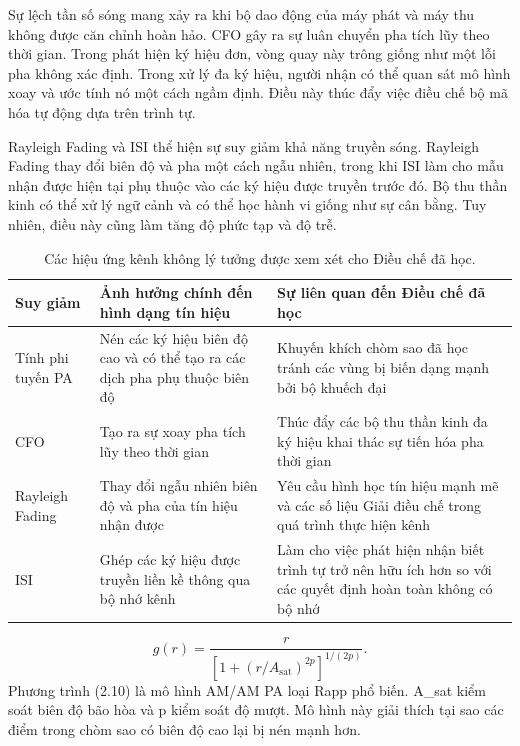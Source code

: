 Sự lệch tần số sóng mang xảy ra khi bộ dao động của máy phát và máy thu không được căn chỉnh hoàn hảo. CFO gây ra sự luân chuyển pha tích lũy theo thời gian. Trong phát hiện ký hiệu đơn, vòng quay này trông giống như một lỗi pha không xác định. Trong xử lý đa ký hiệu, người nhận có thể quan sát mô hình xoay và ước tính nó một cách ngầm định. Điều này thúc đẩy việc điều chế bộ mã hóa tự động dựa trên trình tự.

Rayleigh Fading và ISI thể hiện sự suy giảm khả năng truyền sóng. Rayleigh Fading thay đổi biên độ và pha một cách ngẫu nhiên, trong khi ISI làm cho mẫu nhận được hiện tại phụ thuộc vào các ký hiệu được truyền trước đó. Bộ thu thần kinh có thể xử lý ngữ cảnh và có thể học hành vi giống như sự cân bằng. Tuy nhiên, điều này cũng làm tăng độ phức tạp và độ trễ.

\begin{table}[H]
\centering
\caption{Các hiệu ứng kênh không lý tưởng được xem xét cho Điều chế đã học.}
\label{tab:learned_modulation_impairments}
\begin{tabularx}{\textwidth}{p{}p{}Y}
\toprule
Suy giảm & Ảnh hưởng chính đến hình dạng tín hiệu & Sự liên quan đến Điều chế đã học\\
\midrule
Tính phi tuyến PA & Nén các ký hiệu biên độ cao và có thể tạo ra các dịch pha phụ thuộc biên độ & Khuyến khích chòm sao đã học tránh các vùng bị biến dạng mạnh bởi bộ khuếch đại\\
CFO & Tạo ra sự xoay pha tích lũy theo thời gian & Thúc đẩy các bộ thu thần kinh đa ký hiệu khai thác sự tiến hóa pha thời gian\\
Rayleigh Fading & Thay đổi ngẫu nhiên biên độ và pha của tín hiệu nhận được & Yêu cầu hình học tín hiệu mạnh mẽ và các số liệu Giải điều chế trong quá trình thực hiện kênh\\
ISI & Ghép các ký hiệu được truyền liền kề thông qua bộ nhớ kênh & Làm cho việc phát hiện nhận biết trình tự trở nên hữu ích hơn so với các quyết định hoàn toàn không có bộ nhớ\\
\bottomrule
\end{tabularx}
\end{table}

\begin{equation}
g(r)=\frac{r}{\left[1+\left(r/A_{\mathrm{sat}}\right)^{2p}\right]^{1/(2p)}}.
\end{equation}
Phương trình (2.10) là mô hình AM/AM PA loại Rapp phổ biến. A\_sat kiểm soát biên độ bão hòa và p kiểm soát độ mượt. Mô hình này giải thích tại sao các điểm trong chòm sao có biên độ cao lại bị nén mạnh hơn.


